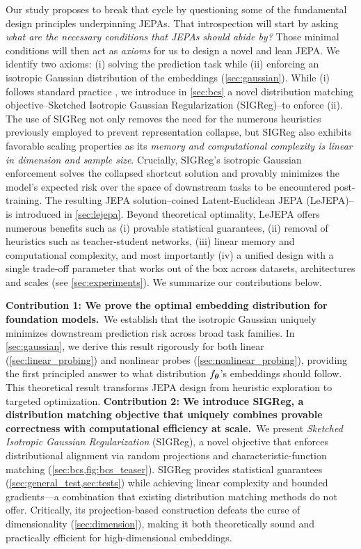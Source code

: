 Our study proposes to break that cycle by questioning some of the fundamental design principles underpinning JEPAs. That introspection will start by asking {\em what are the necessary conditions that JEPAs should abide by?} Those minimal conditions will then act as {\em axioms} for us to design a novel and lean JEPA. We identify two axioms: (i) solving the prediction task while (ii) enforcing an isotropic Gaussian distribution of the embeddings (\cref{sec:gaussian}). While (i) follows standard practice \citep{balestriero2022contrastive}, we introduce  in \cref{sec:bcs} a novel  distribution matching objective--Sketched Isotropic Gaussian Regularization (SIGReg)--to enforce (ii). The use of SIGReg not only removes the need for the numerous heuristics previously employed to prevent representation collapse, but SIGReg also exhibits favorable scaling properties as its {\em memory and computational complexity is linear in dimension and sample size}. Crucially, SIGReg's isotropic Gaussian enforcement solves the collapsed shortcut solution and provably minimizes the model's expected risk over the space of downstream tasks to be encountered post-training. The resulting JEPA solution--coined Latent-Euclidean JEPA (LeJEPA)--is introduced in \cref{sec:lejepa}. Beyond theoretical optimality, LeJEPA offers numerous benefits such as (i) provable statistical guarantees, (ii) removal of heuristics such as teacher-student networks, (iii) linear memory and computational complexity, and most importantly (iv) a unified design with a single trade-off parameter that works out of the box across datasets, architectures and scales (see \cref{sec:experiments}). We summarize our contributions below.

{\bf Contribution 1: We prove the optimal embedding distribution for foundation models.}~We 
establish that the isotropic Gaussian uniquely minimizes downstream prediction risk across 
broad task families. In \cref{sec:gaussian}, we derive this result rigorously for both 
linear (\cref{sec:linear_probing}) and nonlinear probes (\cref{sec:nonlinear_probing}), 
providing the first principled answer to what distribution $f_{{\bm{\theta}}}$'s embeddings 
should follow. This theoretical result transforms JEPA design from heuristic exploration 
to targeted optimization.
{\bf Contribution 2: We introduce SIGReg, a distribution matching objective that uniquely 
combines provable correctness with computational efficiency at scale.}~We present {\em 
Sketched Isotropic Gaussian Regularization} (SIGReg), a novel objective that enforces 
distributional alignment via random projections and characteristic-function matching 
(\cref{sec:bcs,fig:bcs_teaser}). SIGReg provides statistical guarantees 
(\cref{sec:general_test,sec:tests}) while achieving linear complexity and bounded 
gradients—a combination that existing distribution matching methods do not offer. 
Critically, its projection-based construction defeats the curse of dimensionality 
(\cref{sec:dimension}), making it both theoretically sound and practically efficient 
for high-dimensional embeddings.


